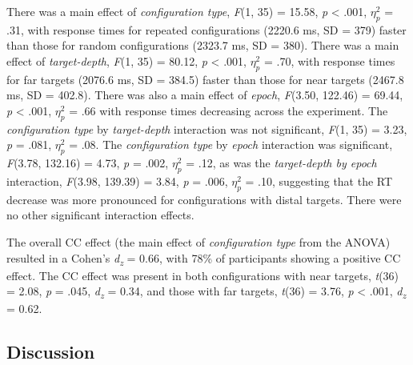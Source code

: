 \documentclass[
  english,
  man,floatsintext]{apa7}
\begin{document}
There was a main effect of \emph{configuration type}, \emph{F}(1, 35) = 15.58, \emph{p} \textless{} .001, \(\eta^2_p\) = .31, with response times for repeated configurations (2220.6 ms, SD = 379) faster than those for random configurations (2323.7 ms, SD = 380). There was a main effect of \emph{target-depth}, \emph{F}(1, 35) = 80.12, \emph{p} \textless{} .001, \(\eta^2_p\) = .70, with response times for far targets (2076.6 ms, SD = 384.5) faster than those for near targets (2467.8 ms, SD = 402.8). There was also a main effect of \emph{epoch}, \emph{F}(3.50, 122.46) = 69.44, \emph{p} \textless{} .001, \(\eta^2_p\) = .66 with response times decreasing across the experiment. The \emph{configuration type} by \emph{target-depth} interaction was not significant, \emph{F}(1, 35) = 3.23, \emph{p} = .081, \(\eta^2_p\) = .08. The \emph{configuration type} by \emph{epoch} interaction was significant, \emph{F}(3.78, 132.16) = 4.73, \emph{p} = .002, \(\eta^2_p\) = .12, as was the \emph{target-depth by epoch} interaction, \emph{F}(3.98, 139.39) = 3.84, \emph{p} = .006, \(\eta^2_p\) = .10, suggesting that the RT decrease was more pronounced for configurations with distal targets. There were no other significant interaction effects.

The overall CC effect (the main effect of \emph{configuration type} from the ANOVA) resulted in a Cohen's \emph{d\textsubscript{z}} = 0.66, with 78\% of participants showing a positive CC effect. The CC effect was present in both configurations with near targets, \emph{t}(36) = 2.08, \emph{p} = .045, \emph{d\textsubscript{z}} = 0.34, and those with far targets, \emph{t}(36) = 3.76, \emph{p} \textless{} .001, \emph{d\textsubscript{z}} = 0.62.

\hypertarget{discussion}{%
\subsection{Discussion}\label{discussion}}
\end{document}
